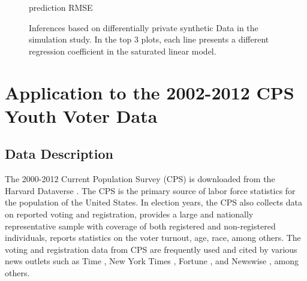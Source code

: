 \documentclass[12pt, A4]{article}
\theoremstyle{plain}
\theoremstyle{exampstyle}\newtheorem{defn}{Definition}
\theoremstyle{exampstyle}\newtheorem{lem}{Lemma}
\theoremstyle{exampstyle}\newtheorem{cor}{Corollary}
\theoremstyle{exampstyle}\newtheorem{pro}{Proposition}
\theoremstyle{exampstyle}\newtheorem{cla}{Claim}
\theoremstyle{exampstyle}\newtheorem{rem}{Remark}
\begin{document}
\begin{figure}[!htb]
\small{prediction RMSE}
\vspace{-9pt}
\caption{Inferences based on differentially private synthetic Data  in the simulation study. In the top 3 plots, each line presents a different regression coefficient in the saturated linear model.}\label{fig:saturated}\vspace{-12pt}
\end{figure}

\section{Application to the 2002-2012 CPS Youth Voter Data}\label{sec:voter}

\subsection{Data Description}
The 2000-2012 Current Population Survey (CPS) is downloaded from the Harvard Dataverse \citep{Dataverse}. The CPS is the primary source of labor force statistics for the population of the United States. In election years, the CPS also collects data on reported voting and registration, provides a large and nationally representative sample with coverage of both registered and non-registered individuals, reports statistics on the voter turnout, age, race, among others. The voting and registration data from CPS are frequently used and cited by various news outlets such as Time \citep{Time}, New York Times \citep{NYT}, Fortune \citep{Fortune}, and Newswise \citep{Newwise}, among others. 
\end{document}
